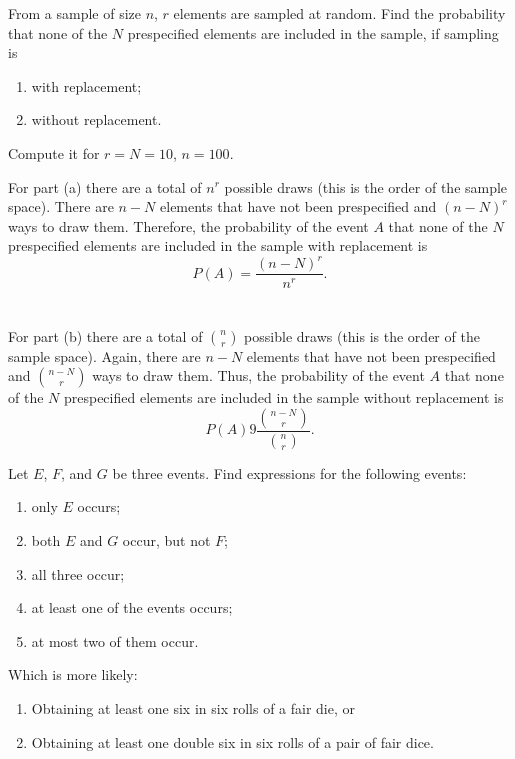 \begin{problem}[Handout 1, \# 9]
  From a sample of size \(n\), \(r\) elements are sampled at random. Find
  the probability that none of the \(N\) prespecified elements are included
  in the sample, if sampling is
  \begin{enumerate}[label=(\alph*),noitemsep]
  \item with replacement;
  \item without replacement.
  \end{enumerate}
  Compute it for \(r=N=10\), \(n=100\).
\end{problem}
\begin{solution}
  For part (a) there are a total of \(n^r\) possible draws (this is the
  order of the sample space). There are \(n-N\) elements that have not been
  prespecified and \((n-N)^r\) ways to draw them. Therefore, the
  probability of the event \(A\) that none of the \(N\) prespecified
  elements are included in the sample with replacement is
  \[
    P(A)=\frac{(n-N)^r}{n^r}.
  \]
  \\\\
  For part (b) there are a total of \(\binom{n}{r}\) possible draws (this
  is the order of the sample space). Again, there are \(n-N\) elements that
  have not been prespecified and \(\binom{n-N}{r}\) ways to draw
  them. Thus, the probability of the event \(A\) that none of the \(N\)
  prespecified elements are included in the sample without replacement is
  \[
    P(A)9\frac{\binom{n-N}{r}}{\binom{n}{r}}.
  \]
\end{solution}

\begin{problem}[Handout 1, \# 11]
  Let \(E\), \(F\), and \(G\) be three events. Find expressions for the
  following events:
  \begin{enumerate}[label=(\alph*),noitemsep]
  \item only \(E\) occurs;
  \item both \(E\) and \(G\) occur, but not \(F\);
  \item all three occur;
  \item at least one of the events occurs;
  \item at most two of them occur.
  \end{enumerate}
\end{problem}
\begin{solution}
\end{solution}

\begin{problem}[Handout 1, \# 12]
  Which is more likely:
  \begin{enumerate}[label=(\alph*),noitemsep]
  \item Obtaining at least one six in six rolls of a fair die, or
  \item Obtaining at least one double six in six rolls of a pair of fair
    dice.
  \end{enumerate}
\end{problem}
\begin{solution}
\end{solution}

